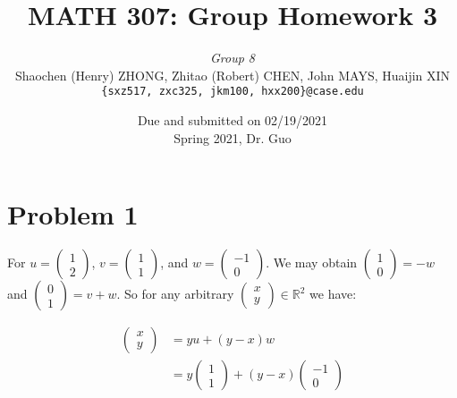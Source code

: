 \documentclass[11pt]{article}
\newcommand{\ilc}{\texttt}
\begin{document}
\title{\textbf{MATH 307: Group Homework 3}}


\author{\textit{Group 8}\\
Shaochen (Henry) ZHONG, Zhitao (Robert) CHEN, John MAYS, Huaijin XIN\\ \ilc{\{sxz517, zxc325, jkm100, hxx200\}@case.edu}}

\date{Due and submitted on 02/19/2021 \\ Spring 2021, Dr. Guo}
\maketitle



\section*{Problem 1}

For $u = \begin{pmatrix} 1 \\ 2\end{pmatrix}$, $v = \begin{pmatrix} 1 \\ 1\end{pmatrix}$, and $w = \begin{pmatrix} -1 \\ 0\end{pmatrix}$. We may obtain $ \begin{pmatrix} 1 \\ 0 \end{pmatrix} = -w$ and $\begin{pmatrix} 0 \\ 1\end{pmatrix} = v + w$. So for any arbitrary $\begin{pmatrix} x \\ y\end{pmatrix} \in \mathbb{R}^2$ we have:

\begin{align*}
    \begin{pmatrix} x \\ y\end{pmatrix} &= y u + (y-x) w \\
    &= y \begin{pmatrix} 1 \\ 1\end{pmatrix} + (y-x)\begin{pmatrix} -1 \\ 0\end{pmatrix}
\end{align*}
\end{document}
